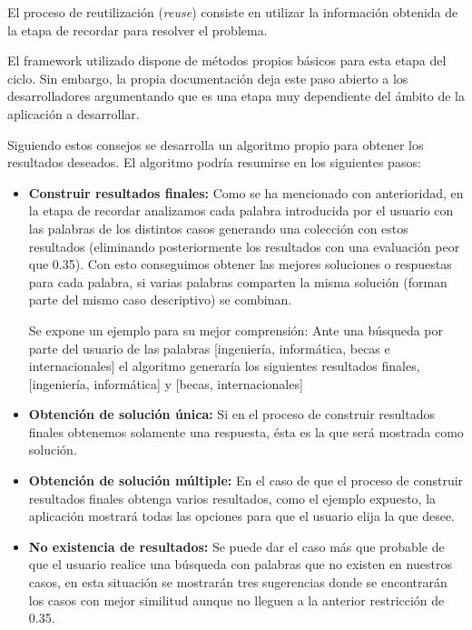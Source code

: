 El proceso de reutilización (\emph{reuse}) consiste en utilizar la información obtenida de la etapa de recordar para resolver el problema.

El framework utilizado dispone de métodos propios básicos para esta etapa del ciclo. Sin embargo, la propia documentación deja este paso abierto a los desarrolladores argumentando que es una etapa muy dependiente del ámbito de la aplicación a desarrollar.

Siguiendo estos consejos se desarrolla un algoritmo propio para obtener los resultados deseados. El algoritmo podría resumirse en los siguientes pasos:

\begin{itemize}
\tightlist
\item
  \textbf{Construir resultados finales:} Como se ha mencionado con anterioridad, en la etapa de recordar analizamos cada palabra introducida por el usuario con las palabras de los distintos casos generando una colección con estos resultados (eliminando posteriormente los resultados con una evaluación peor que 0.35). Con esto conseguimos obtener las mejores soluciones o respuestas para cada palabra, si varias palabras comparten la misma solución (forman parte del mismo caso descriptivo) se combinan.
  
  Se expone un ejemplo para su mejor comprensión:
  Ante una búsqueda por parte del usuario de las palabras 
  [ingeniería, informática, becas e internacionales] 
  el algoritmo generaría los siguientes resultados finales, 
  [ingeniería, informática]  y 
  [becas, internacionales] 
\item
  \textbf{Obtención de solución única:} Si en el proceso de construir resultados finales obtenemos solamente una respuesta, ésta es la que será mostrada como solución.
  \item
  \textbf{Obtención de solución múltiple:} En el caso de que el proceso de construir resultados finales obtenga varios resultados, como el ejemplo expuesto, la aplicación mostrará todas las opciones para que el usuario elija la que desee.
    \item
  \textbf{No existencia de resultados:} Se puede dar el caso más que probable de que el usuario realice una búsqueda con palabras que no existen en nuestros casos, en esta situación se mostrarán tres sugerencias donde se encontrarán los casos con mejor similitud aunque no lleguen a la anterior restricción de 0.35.
\end{itemize}


